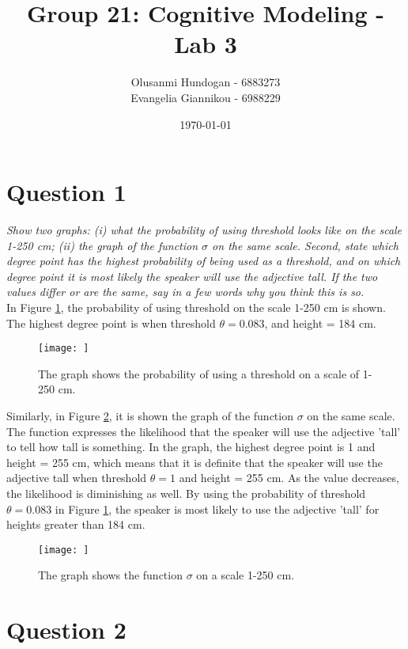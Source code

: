 \documentclass[11pt,a4paper,oneside]{article}
\title{\textbf{Group 21: Cognitive Modeling - Lab 3}}
\date{\today}
\author{Olusanmi Hundogan - 6883273\\
Evangelia Giannikou - 6988229\\
}
\begin{document}
\maketitle

\section{Question 1}
\label{Q1}
\textit{Show two graphs: (i) what the probability of using threshold looks like on the scale 1-250 cm; (ii) the graph of the function $\sigma$ on the same scale. Second, state which degree point has the highest probability of being used as a threshold, and on which degree point it is most likely the speaker will use the adjective tall. If the two values differ or are the same, say in a few words why you think this is so.}\\

In Figure \ref{fig:q1_threshold}, the probability of using threshold on the scale 1-250 cm is shown. The highest degree point is when threshold $ \theta = 0.083$, and height = 184 cm.

\begin{figure}[H]
    \centering
    \texttt{[image: ]}
    \caption{The graph shows the probability of using a threshold on a scale of 1-250 cm.}
  \label{fig:q1_threshold}
\end{figure}

Similarly, in Figure \ref{fig:q1_sigma}, it is shown the graph of the function $\sigma$ on the same scale. The function expresses the likelihood that the speaker will use the adjective 'tall' to tell how tall is something. In the graph, the highest degree point is 1 and height = 255 cm, which means that it is definite that the speaker will use the adjective tall when threshold $ \theta = 1$ and height = 255 cm. As the value decreases, the likelihood is diminishing as well. By using the probability of threshold $\theta = 0.083$ in Figure \ref{fig:q1_threshold}, the speaker is most likely to use the adjective 'tall' for heights greater than 184 cm.

\begin{figure}[H]
    \centering
    \texttt{[image: ]}
    \caption{The graph shows the function $\sigma$ on a scale 1-250 cm.}
  \label{fig:q1_sigma}
\end{figure}



\section{Question 2}
\label{Q2}
\textit{}\\
\end{document}
